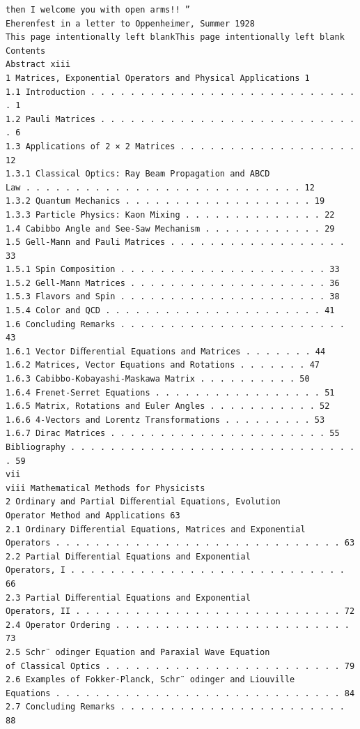 \begin{verbatim}
then I welcome you with open arms!! ”
Eherenfest in a letter to Oppenheimer, Summer 1928
This page intentionally left blankThis page intentionally left blank
Contents
Abstract xiii
1 Matrices, Exponential Operators and Physical Applications 1
1.1 Introduction . . . . . . . . . . . . . . . . . . . . . . . . . . . . 1
1.2 Pauli Matrices . . . . . . . . . . . . . . . . . . . . . . . . . . . 6
1.3 Applications of 2 × 2 Matrices . . . . . . . . . . . . . . . . . . 12
1.3.1 Classical Optics: Ray Beam Propagation and ABCD
Law . . . . . . . . . . . . . . . . . . . . . . . . . . . . 12
1.3.2 Quantum Mechanics . . . . . . . . . . . . . . . . . . . 19
1.3.3 Particle Physics: Kaon Mixing . . . . . . . . . . . . . . 22
1.4 Cabibbo Angle and See-Saw Mechanism . . . . . . . . . . . . 29
1.5 Gell-Mann and Pauli Matrices . . . . . . . . . . . . . . . . . . 33
1.5.1 Spin Composition . . . . . . . . . . . . . . . . . . . . . 33
1.5.2 Gell-Mann Matrices . . . . . . . . . . . . . . . . . . . . 36
1.5.3 Flavors and Spin . . . . . . . . . . . . . . . . . . . . . 38
1.5.4 Color and QCD . . . . . . . . . . . . . . . . . . . . . . 41
1.6 Concluding Remarks . . . . . . . . . . . . . . . . . . . . . . . 43
1.6.1 Vector Diﬀerential Equations and Matrices . . . . . . . 44
1.6.2 Matrices, Vector Equations and Rotations . . . . . . . 47
1.6.3 Cabibbo-Kobayashi-Maskawa Matrix . . . . . . . . . . 50
1.6.4 Frenet-Serret Equations . . . . . . . . . . . . . . . . . 51
1.6.5 Matrix, Rotations and Euler Angles . . . . . . . . . . . 52
1.6.6 4-Vectors and Lorentz Transformations . . . . . . . . . 53
1.6.7 Dirac Matrices . . . . . . . . . . . . . . . . . . . . . . 55
Bibliography . . . . . . . . . . . . . . . . . . . . . . . . . . . . . . 59
vii
viii Mathematical Methods for Physicists
2 Ordinary and Partial Diﬀerential Equations, Evolution
Operator Method and Applications 63
2.1 Ordinary Diﬀerential Equations, Matrices and Exponential
Operators . . . . . . . . . . . . . . . . . . . . . . . . . . . . . 63
2.2 Partial Diﬀerential Equations and Exponential
Operators, I . . . . . . . . . . . . . . . . . . . . . . . . . . . . 66
2.3 Partial Diﬀerential Equations and Exponential
Operators, II . . . . . . . . . . . . . . . . . . . . . . . . . . . 72
2.4 Operator Ordering . . . . . . . . . . . . . . . . . . . . . . . . 73
2.5 Schr¨ odinger Equation and Paraxial Wave Equation
of Classical Optics . . . . . . . . . . . . . . . . . . . . . . . . 79
2.6 Examples of Fokker-Planck, Schr¨ odinger and Liouville
Equations . . . . . . . . . . . . . . . . . . . . . . . . . . . . . 84
2.7 Concluding Remarks . . . . . . . . . . . . . . . . . . . . . . . 88

\end{verbatim}

